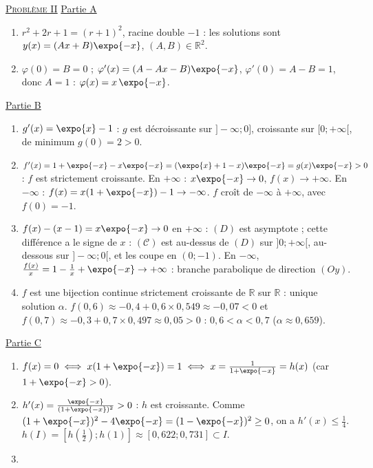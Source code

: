 \begin{corrige}
\noindent \underline{\textsc{Probl\`eme II}} \newline
\underline{Partie A}
\begin{enumerate}
\item $r^2 + 2r + 1 = (r+1)^2$, racine double $-1$ : les solutions sont $y(x) = (Ax + B)\expo{-x}$, $(A , B) \in \mathbb{R}^2$.
\item $\varphi(0) = B = 0$ ; $\varphi'(x) = (A - Ax - B)\expo{-x}$, $\varphi'(0) = A - B = 1$, donc $A = 1$ : $\varphi(x) = x\,\expo{-x}$.
\end{enumerate}
\underline{Partie B}
\begin{enumerate}
\item $g'(x) = \expo{x} - 1$ : $g$ est d\'ecroissante sur $]-\infty ; 0]$, croissante sur $[0 ; +\infty[$, de minimum $g(0) = 2 > 0$.
\item $f'(x) = 1 + \expo{-x} - x\expo{-x} = (\expo{x} + 1 - x)\expo{-x} = g(x)\expo{-x} > 0$ : $f$ est strictement croissante.
      En $+\infty$ : $x\expo{-x} \to 0$, $f(x) \to +\infty$. En $-\infty$ : $f(x) = x(1 + \expo{-x}) - 1 \to -\infty$.
      $f$ cro\^it de $-\infty$ \`a $+\infty$, avec $f(0) = -1$.
\item $f(x) - (x - 1) = x\expo{-x} \to 0$ en $+\infty$ : $(D)$ est asymptote ; cette diff\'erence a le signe de $x$ : $(\mathscr{C})$ est
      au-dessus de $(D)$ sur $]0 ; +\infty[$, au-dessous sur $]-\infty ; 0[$, et les coupe en $(0 ; -1)$.
      En $-\infty$, $\frac{f(x)}{x} = 1 - \frac{1}{x} + \expo{-x} \to +\infty$ : branche parabolique de direction $(Oy)$.
\item $f$ est une bijection continue strictement croissante de $\mathbb{R}$ sur $\mathbb{R}$ : unique solution $\alpha$.
      $f(0{,}6) \approx -0{,}4 + 0{,}6 \times 0{,}549 \approx -0{,}07 < 0$ et $f(0{,}7) \approx -0{,}3 + 0{,}7 \times 0{,}497 \approx 0{,}05 > 0$ :
      $0{,}6 < \alpha < 0{,}7$ ($\alpha \approx 0{,}659$).
\end{enumerate}
\underline{Partie C}
\begin{enumerate}
\item $f(x) = 0 \iff x(1 + \expo{-x}) = 1 \iff x = \frac{1}{1 + \expo{-x}} = h(x)$ (car $1 + \expo{-x} > 0$).
\item $h'(x) = \frac{\expo{-x}}{(1 + \expo{-x})^2} > 0$ : $h$ est croissante. Comme $(1 + \expo{-x})^2 - 4\expo{-x} = (1 - \expo{-x})^2 \geq 0$,
      on a $h'(x) \leq \frac{1}{4}$. $h(I) = [h(\frac{1}{2}) ; h(1)] \approx [0{,}622 ; 0{,}731] \subset I$.
\item \begin{enumerate}

\end{enumerate}
\end{enumerate}
\end{corrige}
